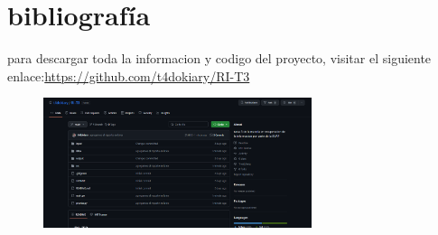 \section{bibliografía}

para descargar toda la informacion y codigo del proyecto, visitar el siguiente enlace:\newline \href{https://github.com/t4dokiary/RI-T3}{https://github.com/t4dokiary/RI-T3}

\begin{figure}[ht]
  \centering
  \includegraphics[width=0.7\textwidth]{./src/img/fuente/image.png}
\end{figure}